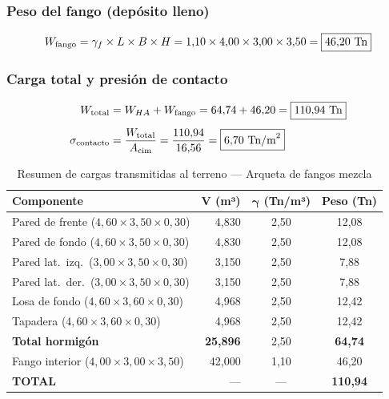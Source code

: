 \subsubsection{Peso del fango (depósito lleno)}

\[
  W_\text{fango} = \gamma_f\times L\times B\times H
    = 1{,}10\times4{,}00\times3{,}00\times3{,}50
    = \boxed{46{,}20~\text{Tn}}
\]

\subsubsection{Carga total y presión de contacto}

\begin{align*}
  W_\text{total} &= W_{HA} + W_\text{fango}
    = 64{,}74 + 46{,}20 = \boxed{110{,}94~\text{Tn}}\\[4pt]
  \sigma_\text{contacto} &= \frac{W_\text{total}}{A_\text{cim}}
    = \frac{110{,}94}{16{,}56} = \boxed{6{,}70~\text{Tn/m}^2}
\end{align*}

\begin{table}[H]
  \centering
  \caption{Resumen de cargas transmitidas al terreno --- Arqueta de fangos mezcla}
  \label{tab:cargas_arqueta}
  \begin{tabular}{@{}lrcc@{}}
    \toprule
    \textbf{Componente} & \textbf{V (m³)} & $\boldsymbol{\gamma}$ \textbf{(Tn/m³)} & \textbf{Peso (Tn)}\\
    \midrule
    Pared de frente ($4{,}60\times3{,}50\times0{,}30$) & 4,830 & 2,50 & 12,08\\
    Pared de fondo  ($4{,}60\times3{,}50\times0{,}30$) & 4,830 & 2,50 & 12,08\\
    Pared lat.\ izq.\ ($3{,}00\times3{,}50\times0{,}30$) & 3,150 & 2,50 & 7,88\\
    Pared lat.\ der.\ ($3{,}00\times3{,}50\times0{,}30$) & 3,150 & 2,50 & 7,88\\
    Losa de fondo ($4{,}60\times3{,}60\times0{,}30$)   & 4,968 & 2,50 & 12,42\\
    Tapadera ($4{,}60\times3{,}60\times0{,}30$)        & 4,968 & 2,50 & 12,42\\
    \midrule
    \textbf{Total hormigón} & \textbf{25,896} & 2,50 & \textbf{64,74}\\
    Fango interior ($4{,}00\times3{,}00\times3{,}50$)  & 42,000 & 1,10 & 46,20\\
    \midrule
    \textbf{TOTAL} & --- & --- & \textbf{110,94}\\
    \bottomrule
  \end{tabular}
\end{table}

